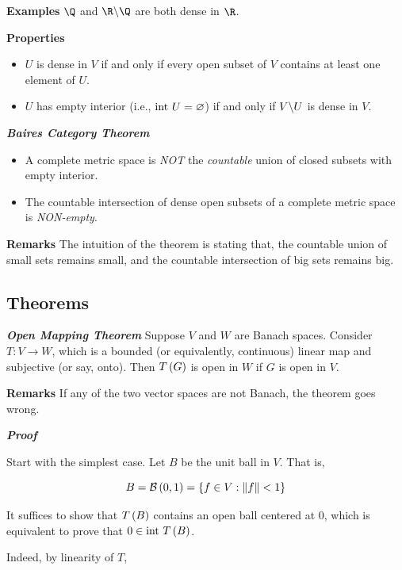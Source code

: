 \documentclass[
]{article}
\begin{document}
\textbf{Examples} \(\Q\) and \(\R\c \Q\) are both dense in \(\R\).

\textbf{Properties}

\begin{itemize}
\item
  \(U\) is dense in \(V\) if and only if every open subset of \(V\)
  contains at least one element of \(U\).
\item
  \(U\) has empty interior (i.e., \(\text{int }U = \varnothing\)) if and only
  if \(V\backslash U\) is dense in \(V\).
\end{itemize}

\emph{\textbf{Baire\textquotesingle s Category Theorem}}

\begin{itemize}
\item
  A complete metric space is \emph{NOT} the \emph{countable} union of
  closed subsets with empty interior.
\item
  The countable intersection of dense open subsets of a complete metric
  space is \emph{NON-empty}.
\end{itemize}

\textbf{Remarks} The intuition of the theorem is stating that, the
countable union of small sets remains small, and the countable
intersection of big sets remains big.

\hypertarget{theorems}{%
\subsection{Theorems}\label{theorems}}

\emph{\textbf{Open Mapping Theorem}} Suppose \(V\) and \(W\) are Banach
spaces. Consider \(T:V\to W\), which is a bounded (or equivalently,
continuous) linear map and subjective (or say, onto). Then \(T\left(G\right)\)
is open in \(W\) if \(G\) is open in \(V\).

\textbf{Remarks} If any of the two vector spaces are not Banach, the
theorem goes wrong.

\emph{\textbf{Proof}}

Start with the simplest case. Let \(B\) be the unit ball in \(V\). That
is,

\[B = \mathcal B\left(0,1\right) = \left\{f\in V:\|{f}\|< 1\right\}\]

It suffices to show that \(T\left(B\right)\) contains an open ball centered at
\(0\), which is equivalent to prove that \(0\in \text{int }T\left(B\right)\).

Indeed, by linearity of \(T\),
\end{document}
